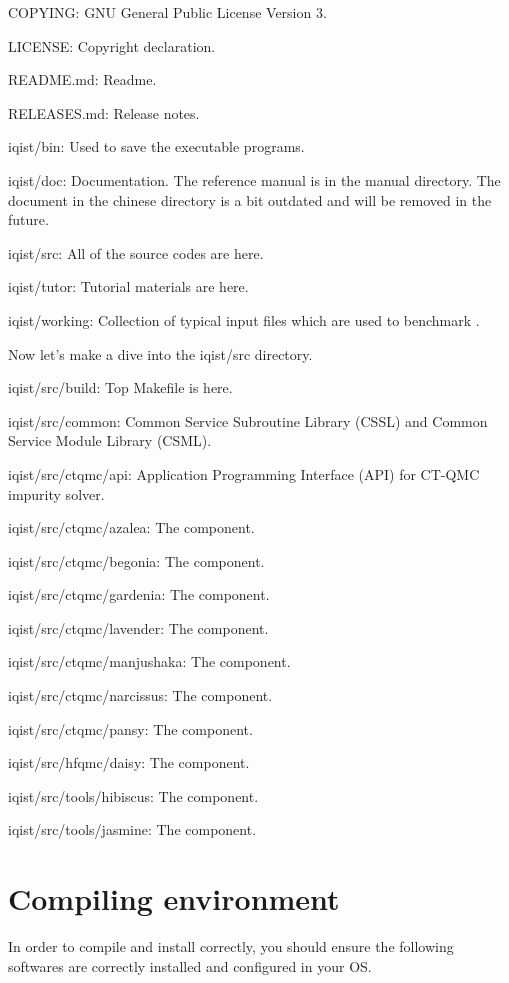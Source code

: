 COPYING: GNU General Public License Version 3.

LICENSE: Copyright declaration.

README.md: Readme.

RELEASES.md: Release notes.

iqist/bin: Used to save the executable programs.

iqist/doc: Documentation. The reference manual is in the manual directory. The document in the chinese directory is a bit outdated and will be removed in the future.

iqist/src: All of the source codes are here.

iqist/tutor: Tutorial materials are here.

iqist/working: Collection of typical input files which are used to benchmark {\iqist}.

Now let's make a dive into the iqist/src directory.

iqist/src/build: Top Makefile is here.

iqist/src/common: Common Service Subroutine Library (CSSL) and Common Service Module Library (CSML).

iqist/src/ctqmc/api: Application Programming Interface (API) for CT-QMC impurity solver.

iqist/src/ctqmc/azalea: The {\azalea} component.

iqist/src/ctqmc/begonia: The {\begonia} component.

iqist/src/ctqmc/gardenia: The {\gardenia} component.

iqist/src/ctqmc/lavender: The {\lavender} component.

iqist/src/ctqmc/manjushaka: The {\manjushaka} component.

iqist/src/ctqmc/narcissus: The {\narcissus} component.

iqist/src/ctqmc/pansy: The {\pansy} component.

iqist/src/hfqmc/daisy: The {\daisy} component.

iqist/src/tools/hibiscus: The {\hibiscus} component.

iqist/src/tools/jasmine: The {\jasmine} component.

\section{Compiling environment}

In order to compile and install {\iqist} correctly, you should ensure the following softwares are correctly installed and configured in your OS.

